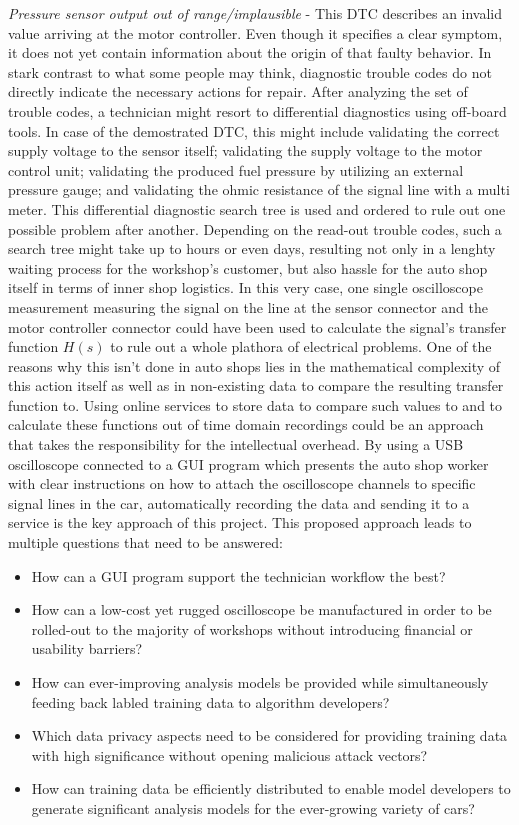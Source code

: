 \textit{Pressure sensor output out of range/implausible} - This DTC describes an invalid value arriving at the motor controller.
Even though it specifies a clear symptom, it does not yet contain information about the origin of that faulty behavior.
In stark contrast to what some people may think, diagnostic trouble codes do not directly indicate the necessary actions for repair.
After analyzing the set of trouble codes, a technician might resort to differential diagnostics using off-board tools.
In case of the demostrated DTC, this might include validating the correct supply voltage to the sensor itself; 
validating the supply voltage to the motor control unit; validating the produced fuel pressure by utilizing an external pressure gauge; and validating the ohmic resistance of the signal line with a multi meter.
This differential diagnostic search tree is used and ordered to rule out one possible problem after another.
Depending on the read-out trouble codes, such a search tree might take up to hours or even days, resulting not only in a lenghty waiting process for the workshop's customer, but also hassle for the auto shop itself in terms of inner shop logistics.
In this very case, one single oscilloscope measurement measuring the signal on the line at the sensor connector and the motor controller connector could have been used to calculate the signal's transfer function $H(s)$ to rule out a whole plathora of electrical problems.
One of the reasons why this isn't done in auto shops lies in the mathematical complexity of this action itself as well as in non-existing data to compare the resulting transfer function to.
Using online services to store data to compare such values to and to calculate these functions out of time domain recordings could be an approach that takes the responsibility for the intellectual overhead.
By using a USB oscilloscope connected to a GUI program which presents the auto shop worker with clear instructions on how to attach the oscilloscope channels to specific signal lines in the car, automatically recording the data and sending it to a service is the key approach of this project. 
This proposed approach leads to multiple questions that need to be answered:
\begin{itemize}
  \item How can a GUI program support the technician workflow the best?
  \item How can a low-cost yet rugged oscilloscope be manufactured in order to be rolled-out to the majority of workshops without introducing financial or usability barriers?
  \item How can ever-improving analysis models be provided while simultaneously feeding back labled training data to algorithm developers?
  \item Which data privacy aspects need to be considered for providing training data with high significance without opening malicious attack vectors?
  \item How can training data be efficiently distributed to enable model developers to generate significant analysis models for the ever-growing variety of cars?
\end{itemize}


